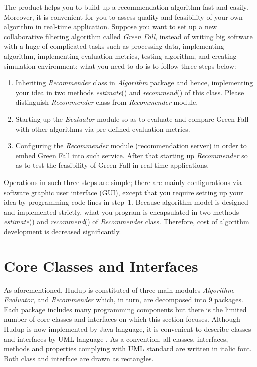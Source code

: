 \documentclass[a4paper]{llncs}
\begin{document}
The product helps you to build up a recommendation algorithm fast and easily. Moreover, it is convenient for you to assess quality and feasibility of your own algorithm in real-time application. Suppose you want to set up a new collaborative filtering algorithm called \textit{Green Fall}, instead of writing big software with a huge of complicated tasks such as processing data, implementing algorithm, implementing evaluation metrics, testing algorithm, and creating simulation environment; what you need to do is to follow three steps below:
\begin{enumerate}
\item Inheriting \textit{Recommender} class in \textit{Algorithm} package and hence, implementing your idea in two methods \textit{estimate}() and \textit{recommend}() of this class. Please distinguish \textit{Recommender} class from \textit{Recommender} module.
\item Starting up the \textit{Evaluator} module so as to evaluate and compare Green Fall with other algorithms via pre-defined evaluation metrics.
\item Configuring the \textit{Recommender} module (recommendation server) in order to embed Green Fall into such service. After that starting up \textit{Recommender} so as to test the feasibility of Green Fall in real-time applications.
\end{enumerate}
Operations in such three steps are simple; there are mainly configurations via software graphic user interface (GUI), except that you require setting up your idea by programming code lines in step~1. Because algorithm model is designed and implemented strictly, what you program is encapsulated in two methods \textit{estimate}() and \textit{recommend}() of \textit{Recommender} class. Therefore, cost of algorithm development is decreased significantly.

\section{Core Classes and Interfaces}
\label{sec:classes}
As aforementioned, Hudup is constituted of three main modules \textit{Algorithm}, \textit{Evaluator}, and \textit{Recommender} which, in turn, are decomposed into 9 packages. Each package includes many programming components but there is the limited number of core classes and interfaces on which this section focuses. Although Hudup is now implemented by Java language, it is convenient to describe classes and interfaces by UML language \cite{duong2008}. As a convention, all classes, interfaces, methods and properties complying with UML standard are written in italic font. Both class and interface are drawn as rectangles.
\end{document}
